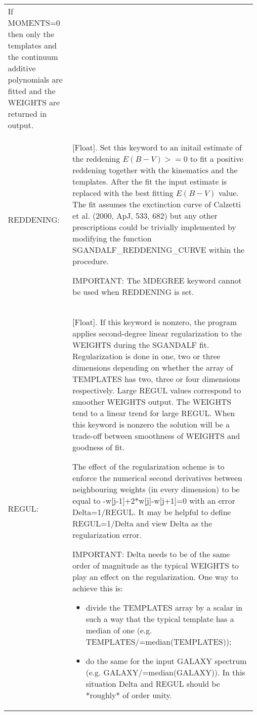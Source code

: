 \documentclass[11pt]{book}
\begin{document}
\begin{center}
\begin{longtable}{p{2.7cm}| p{11.1cm}}
       If MOMENTS=0 then only the templates and the continuum additive
       polynomials are fitted and the WEIGHTS are returned in output.\\
%
  REDDENING: & [Float]. Set this keyword to an initail estimate of the reddening $E(B-V)>=0$
      to fit a positive reddening together with the kinematics and the templates.
      After the fit the input estimate is replaced with the best fitting $E(B-V)$ value.
      The fit assumes the exctinction curve of Calzetti et al. (2000, ApJ, 533, 682)
      but any other prescriptions could be trivially implemented by modifying the
      function SGANDALF\_REDDENING\_CURVE within the procedure.

      IMPORTANT: The MDEGREE keyword cannot be used when REDDENING is set. \\
%
   REGUL:  & [Float]. If this keyword is nonzero, the program applies second-degree
       linear regularization to the WEIGHTS during the SGANDALF fit.
       Regularization is done in one, two or three dimensions depending on whether
       the array of TEMPLATES has two, three or four dimensions respectively.
       Large REGUL values correspond to smoother WEIGHTS output. The WEIGHTS tend
       to a linear trend for large REGUL. When this keyword is nonzero the solution
       will be a trade-off between smoothness of WEIGHTS and goodness of fit.

       The effect of the regularization scheme is to enforce the numerical second 
       derivatives between neighbouring weights (in every dimension) to be equal 
       to -w[j-1]+2*w[j]-w[j+1]=0 with an error Delta=1/REGUL. It may be helpful 
       to define REGUL=1/Delta and view Delta as the regularization error.

      IMPORTANT: Delta needs to be of the same order of magnitude as the typical 
       WEIGHTS to play an effect on the regularization. One way to achieve this is: 
     \begin{itemize}
       \item divide the TEMPLATES array by a scalar in such a way that the typical 
         template has a median of one (e.g. TEMPLATES/=median(TEMPLATES)); 
       \item do the same for the input GALAXY spectrum (e.g. GALAXY/=median(GALAXY)). 
         In this situation Delta and REGUL should be *roughly* of order unity. 
     \end{itemize}


\end{longtable}
\end{center}
\end{document}
